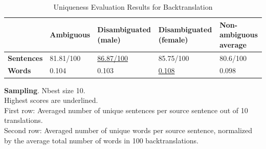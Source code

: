 \begin{table}[!htb]
    \begin{subtable}{\textwidth}
        \centering
        \begin{tabularx}{\linewidth}{|X|XXXX|}
            \hline
             & \textbf{Ambiguous} & \textbf{Disambiguated (male)} & \textbf{Disambiguated (female)} & \textbf{Non-ambiguous average} \\ \hline
             \textbf{Sentences} & 81.81/100 & \underline{86.87/100} & 85.75/100 & 80.6/100 \\ 
             \textbf{Words} & 0.104 & 0.103 & \underline{0.108} & 0.098 \\ \hline
        \end{tabularx}
        \caption{\textbf{Sampling}. Nbest size 10. \\ Highest scores are underlined. \\ First row: Averaged number of unique sentences per source sentence out of 10 translations. \\ Second row: Averaged number of unique words per source sentence, normalized by the average total number of words in 100 backtranslations.}
        \label{tab:uniqueness_backtranslation_sampling}
    \end{subtable}

    \caption{Uniqueness Evaluation Results for Backtranslation}
    \label{tab:uniqueness_backtranslation}
\end{table}

